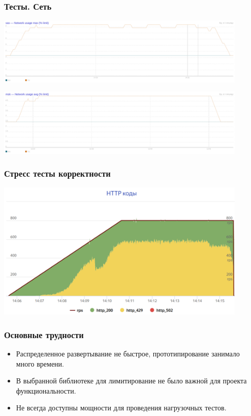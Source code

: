 \documentclass[14pt,aspectratio=169,hyperref={pdftex,unicode},xcolor=dvipsnames]{beamer}
\begin{document}
\begin{frame}
\frametitle{Тесты. Сеть}
\begin{center}
\includegraphics[width=12cm]{images/netOff.png}

\includegraphics[width=12cm]{images/netOn.png}
\end{center}
\end{frame}

\begin{frame}
\frametitle{Стресс тесты корректности}
\begin{center}
\includegraphics[width=12cm]{images/stress.png}
\end{center}
\end{frame}

\begin{frame}
\frametitle{Основные трудности}
\begin{itemize}
\item Распределенное развертывание не быстрое, прототипирование занимало много времени.
\item В выбранной библиотеке для лимитирование не было важной для проекта функциональности.
\item Не всегда доступны мощности для проведения нагрузочных тестов.
\end{itemize}

\end{frame}
\end{document}
